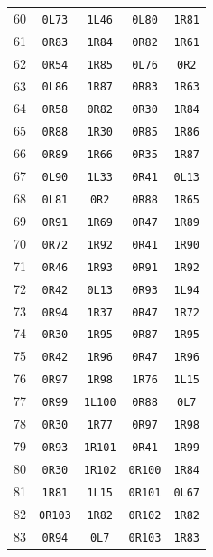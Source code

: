 \begin{longtable}{rcccc}
60 & \texttt{0L73} & \texttt{1L46} & \texttt{0L80} & \texttt{1R81} \\
61 & \texttt{0R83} & \texttt{1R84} & \texttt{0R82} & \texttt{1R61} \\
62 & \texttt{0R54} & \texttt{1R85} & \texttt{0L76} & \texttt{0R2} \\
63 & \texttt{0L86} & \texttt{1R87} & \texttt{0R83} & \texttt{1R63} \\
64 & \texttt{0R58} & \texttt{0R82} & \texttt{0R30} & \texttt{1R84} \\
65 & \texttt{0R88} & \texttt{1R30} & \texttt{0R85} & \texttt{1R86} \\
66 & \texttt{0R89} & \texttt{1R66} & \texttt{0R35} & \texttt{1R87} \\
67 & \texttt{0L90} & \texttt{1L33} & \texttt{0R41} & \texttt{0L13} \\
68 & \texttt{0L81} & \texttt{0R2} & \texttt{0R88} & \texttt{1R65} \\
69 & \texttt{0R91} & \texttt{1R69} & \texttt{0R47} & \texttt{1R89} \\
70 & \texttt{0R72} & \texttt{1R92} & \texttt{0R41} & \texttt{1R90} \\
71 & \texttt{0R46} & \texttt{1R93} & \texttt{0R91} & \texttt{1R92} \\
72 & \texttt{0R42} & \texttt{0L13} & \texttt{0R93} & \texttt{1L94} \\
73 & \texttt{0R94} & \texttt{1R37} & \texttt{0R47} & \texttt{1R72} \\
74 & \texttt{0R30} & \texttt{1R95} & \texttt{0R87} & \texttt{1R95} \\
75 & \texttt{0R42} & \texttt{1R96} & \texttt{0R47} & \texttt{1R96} \\
76 & \texttt{0R97} & \texttt{1R98} & \texttt{1R76} & \texttt{1L15} \\
77 & \texttt{0R99} & \texttt{1L100} & \texttt{0R88} & \texttt{0L7} \\
78 & \texttt{0R30} & \texttt{1R77} & \texttt{0R97} & \texttt{1R98} \\
79 & \texttt{0R93} & \texttt{1R101} & \texttt{0R41} & \texttt{1R99} \\
80 & \texttt{0R30} & \texttt{1R102} & \texttt{0R100} & \texttt{1R84} \\
81 & \texttt{1R81} & \texttt{1L15} & \texttt{0R101} & \texttt{0L67} \\
82 & \texttt{0R103} & \texttt{1R82} & \texttt{0R102} & \texttt{1R82} \\
83 & \texttt{0R94} & \texttt{0L7} & \texttt{0R103} & \texttt{1R83} \\

\end{longtable}
